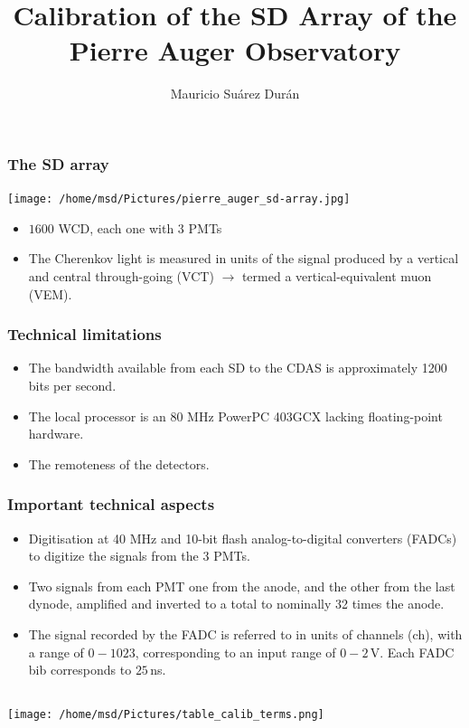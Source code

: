 \documentclass[aspectratio=169]{beamer}
\title{Calibration of the SD Array of the Pierre Auger Observatory}
\author{
  Mauricio Su\'arez Dur\'an
}
\institute{IIHE-ULB}
\begin{document}
\begin{frame}
  \titlepage
\end{frame}

\begin{frame}
  \frametitle{The SD array}
  \centering
    \texttt{[image: /home/msd/Pictures/pierre\_auger\_sd-array.jpg]}
    \begin{itemize}
      \item<1-> $1600$ WCD, each one with $3$ PMTs
      \item<2-> The Cherenkov light is measured in units of the
        signal produced by a vertical and central through-going
        (VCT) $\rightarrow$ termed a vertical-equivalent muon
        (VEM).
    \end{itemize}
\end{frame}

\begin{frame}
  \frametitle{Technical limitations}
  \begin{itemize}
      \item<1-> The bandwidth available from each SD to the CDAS
        is approximately 1200 bits per second.
      \item<2-> The local processor is an 80 MHz PowerPC 403GCX
        lacking ﬂoating-point hardware.
      \item<3-> The remoteness of the detectors.
  \end{itemize}
\end{frame}

\begin{frame}
  \frametitle{Important technical aspects}
  \begin{itemize}
    \item<1-> Digitisation at 40 MHz and 10-bit ﬂash
      analog-to-digital converters (FADCs) to digitize the
      signals from the 3 PMTs.
    \item<2-> Two signals from each PMT one from the anode, and
      the other from the last dynode, amplified and inverted to a
      total to nominally 32 times the anode.
    \item<3-> The signal recorded by the FADC is referred to in
      units of channels (ch), with a range of $0-1023$,
      corresponding to an input range of $0-2$\,V. Each FADC bib
      corresponds to $25$\,ns.
  \end{itemize}
\end{frame}


\begin{frame}
  \begin{columns}
    \begin{column}{.9\textwidth}
      \texttt{[image: /home/msd/Pictures/table\_calib\_terms.png]}
    \end{column}
  \end{columns}
\end{frame}
\end{document}
